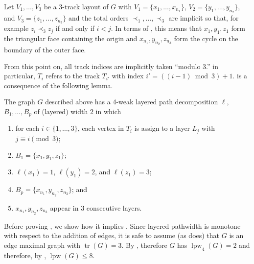 \documentclass{patmorin}
\DeclareMathOperator{\tr}{tr}
\DeclareMathOperator{\lpw}{lpw}
\begin{document}
Let $V_1,\ldots,V_3$ be a 3-track layout of $G$ with
$V_1=\{x_1,\ldots,x_{n_1}\}$, $V_2=\{y_1,\ldots,y_{n_2}\}$, and
$V_3=\{z_1,\ldots,z_{n_3}\}$ and the total orders $\prec_1,\ldots,\prec_3$
are implicit so that, for example $z_i\prec_3 z_j$ if and only if $i<j$.
In terms of , this means that $x_1,y_1,z_1$ form
the triangular face containing the origin and $x_{n_1},y_{n_2},z_{n_3}$
form the cycle on the boundary of the outer face.

From this point on, all track indices are implicitly taken ``modulo
3.'' in particular, $T_i$ refers to the track $T_{i'}$ with index
$i'=((i-1)\bmod 3)+1$.   is a consequence of the following 
lemma.

\begin{lem}
  The graph $G$ described above has a 4-weak layered path decomposition
  $\ell$, $B_1,\ldots,B_p$ of (layered) width $2$ in which 
  \begin{enumerate}
    \item for each $i\in\{1,\ldots,3\}$, each vertex in $T_i$ is assign to a layer $L_j$ with $j\equiv i\pmod 3$;
    \item $B_1=\{x_1,y_1,z_1\}$;
    \item $\ell(x_1)=1$, $\ell(y_1)=2$, and $\ell(z_1)=3$;
    \item $B_p=\{x_{n_1},y_{n_2},z_{n_3}\}$; and
    \item $x_{n_1},y_{n_2},z_{n_3}$ appear in 3 consecutive layers.
  \end{enumerate}
\end{lem}

Before proving , we show how it implies .
Since layered pathwidth is monotone with respect to the addition
of edges, it is safe to assume (as  does) that $G$ is an
edge maximal graph with $\tr(G)=3$.  By , therefore $G$
has $\lpw_4(G)=2$ and therefore, by , $\lpw(G)\le 8$.
\end{document}
